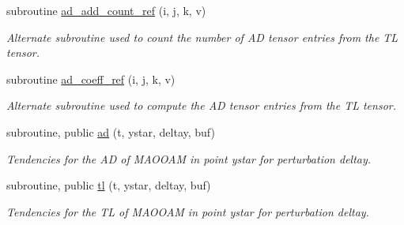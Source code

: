\begin{DoxyCompactItemize}
subroutine \hyperlink{namespacetl__ad__tensor_a3c0b4e0e1f18a0f85b874542b76cfa8a}{ad\+\_\+add\+\_\+count\+\_\+ref} (i, j, k, v)
\begin{DoxyCompactList}\small\item\em Alternate subroutine used to count the number of AD tensor entries from the TL tensor. \end{DoxyCompactList}\item 
subroutine \hyperlink{namespacetl__ad__tensor_aef0157a16688323e3c855ef451d6948f}{ad\+\_\+coeff\+\_\+ref} (i, j, k, v)
\begin{DoxyCompactList}\small\item\em Alternate subroutine used to compute the AD tensor entries from the TL tensor. \end{DoxyCompactList}\item 
subroutine, public \hyperlink{namespacetl__ad__tensor_af4683da4f4149b809eb66c3223266ffd}{ad} (t, ystar, deltay, buf)
\begin{DoxyCompactList}\small\item\em Tendencies for the AD of M\+A\+O\+O\+AM in point ystar for perturbation deltay. \end{DoxyCompactList}\item 
subroutine, public \hyperlink{namespacetl__ad__tensor_a2a6bcaa9d4e82c35f6bfb2fdb9016dd9}{tl} (t, ystar, deltay, buf)
\begin{DoxyCompactList}\small\item\em Tendencies for the TL of M\+A\+O\+O\+AM in point ystar for perturbation deltay. \end{DoxyCompactList}\end{DoxyCompactItemize}
